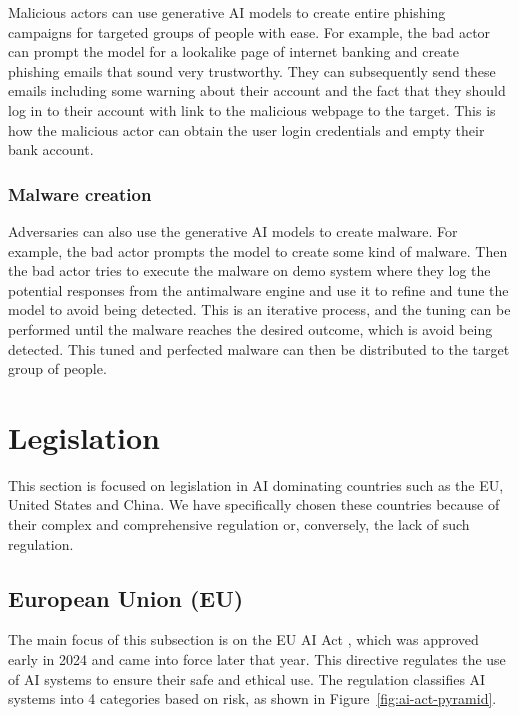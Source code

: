 Malicious actors can use generative AI models to create entire phishing campaigns for targeted groups of people with ease. For example, the bad actor can prompt the model for a lookalike page of internet banking and create phishing emails that sound very trustworthy. They can subsequently send these emails including some warning about their account and the fact that they should log in to their account with link to the malicious webpage to the target. This is how the malicious actor can obtain the user login credentials and empty their bank account.

\subsubsection*{Malware creation}

Adversaries can also use the generative AI models to create malware. For example, the bad actor prompts the model to create some kind of malware. Then the bad actor tries to execute the malware on demo system where they log the potential responses from the antimalware engine and use it to refine and tune the model to avoid being detected. This is an iterative process, and the tuning can be performed until the malware reaches the desired outcome, which is avoid being detected. This tuned and perfected malware can then be distributed to the target group of people.

\section{Legislation} \label{sec:legislation}

This section is focused on legislation in AI dominating countries such as the EU, United States and China. We have specifically chosen these countries because of their complex and comprehensive regulation or, conversely, the lack of such regulation.

\subsection{European Union (EU)}
The main focus of this subsection is on the EU AI Act \cite{eu_ai_act_2024}, which was approved early in 2024 and came into force later that year. This directive regulates the use of AI systems to ensure their safe and ethical use. The regulation classifies AI systems into 4 categories based on risk, as shown in Figure~\ref{fig:ai-act-pyramid}.

